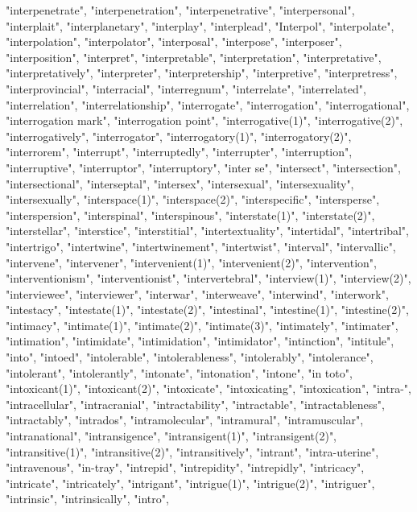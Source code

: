 "interpenetrate",
"interpenetration",
"interpenetrative",
"interpersonal",
"interplait",
"interplanetary",
"interplay",
"interplead",
"Interpol",
"interpolate",
"interpolation",
"interpolator",
"interposal",
"interpose",
"interposer",
"interposition",
"interpret",
"interpretable",
"interpretation",
"interpretative",
"interpretatively",
"interpreter",
"interpretership",
"interpretive",
"interpretress",
"interprovincial",
"interracial",
"interregnum",
"interrelate",
"interrelated",
"interrelation",
"interrelationship",
"interrogate",
"interrogation",
"interrogational",
"interrogation mark",
"interrogation point",
"interrogative(1)",
"interrogative(2)",
"interrogatively",
"interrogator",
"interrogatory(1)",
"interrogatory(2)",
"interrorem",
"interrupt",
"interruptedly",
"interrupter",
"interruption",
"interruptive",
"interruptor",
"interruptory",
"inter se",
"intersect",
"intersection",
"intersectional",
"interseptal",
"intersex",
"intersexual",
"intersexuality",
"intersexually",
"interspace(1)",
"interspace(2)",
"interspecific",
"intersperse",
"interspersion",
"interspinal",
"interspinous",
"interstate(1)",
"interstate(2)",
"interstellar",
"interstice",
"interstitial",
"intertextuality",
"intertidal",
"intertribal",
"intertrigo",
"intertwine",
"intertwinement",
"intertwist",
"interval",
"intervallic",
"intervene",
"intervener",
"intervenient(1)",
"intervenient(2)",
"intervention",
"interventionism",
"interventionist",
"intervertebral",
"interview(1)",
"interview(2)",
"interviewee",
"interviewer",
"interwar",
"interweave",
"interwind",
"interwork",
"intestacy",
"intestate(1)",
"intestate(2)",
"intestinal",
"intestine(1)",
"intestine(2)",
"intimacy",
"intimate(1)",
"intimate(2)",
"intimate(3)",
"intimately",
"intimater",
"intimation",
"intimidate",
"intimidation",
"intimidator",
"intinction",
"intitule",
"into",
"intoed",
"intolerable",
"intolerableness",
"intolerably",
"intolerance",
"intolerant",
"intolerantly",
"intonate",
"intonation",
"intone",
"in toto",
"intoxicant(1)",
"intoxicant(2)",
"intoxicate",
"intoxicating",
"intoxication",
"intra-",
"intracellular",
"intracranial",
"intractability",
"intractable",
"intractableness",
"intractably",
"intrados",
"intramolecular",
"intramural",
"intramuscular",
"intranational",
"intransigence",
"intransigent(1)",
"intransigent(2)",
"intransitive(1)",
"intransitive(2)",
"intransitively",
"intrant",
"intra-uterine",
"intravenous",
"in-tray",
"intrepid",
"intrepidity",
"intrepidly",
"intricacy",
"intricate",
"intricately",
"intrigant",
"intrigue(1)",
"intrigue(2)",
"intriguer",
"intrinsic",
"intrinsically",
"intro",
